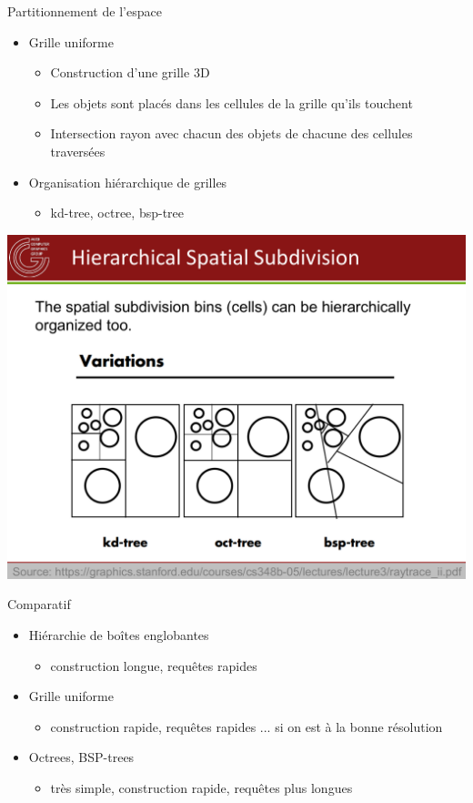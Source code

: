 \begin{frame}{Partitionnement de l'espace}
    \begin{itemize}
        \item Grille uniforme 
        \begin{itemize}
            \item Construction d'une grille 3D 
            \item Les objets sont placés dans les cellules de la grille qu'ils touchent 
            \item Intersection rayon avec chacun des objets de chacune des cellules traversées 
        \end{itemize}
        \item Organisation hiérarchique de grilles 
        \begin{itemize}
            \item kd-tree, octree, bsp-tree
        \end{itemize} 
    \end{itemize}
    \begin{center}
        \includegraphics[width=.8\textwidth]{figs/trees.pdf}
    \end{center}
\end{frame}

\begin{frame}{Comparatif}
    \begin{itemize}
        \item Hiérarchie de boîtes englobantes 
        \begin{itemize}
            \item construction longue, requêtes rapides 
        \end{itemize}
        \item Grille uniforme 
        \begin{itemize}
            \item construction rapide, requêtes rapides ... si on est à la bonne résolution
        \end{itemize}
        \item Octrees, BSP-trees
        \begin{itemize}
            \item très simple, construction rapide, requêtes plus longues
        \end{itemize}
    \end{itemize}
\end{frame}

